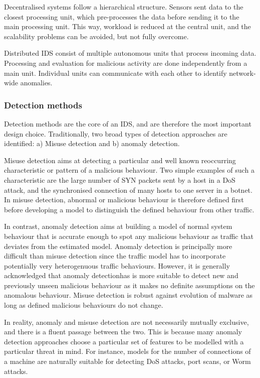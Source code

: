 \documentclass[a4paper,12pt,twoside]{report}
\begin{document}
Decentralised systems follow a hierarchical structure. Sensors sent data to the closest processing unit, which pre-processes the data before sending it to the main processing unit. This way, workload is reduced at the central unit, and
the scalability problems can be avoided, but not fully overcome. 

Distributed IDS consist of multiple autonomous units that process incoming data. Processing and evaluation for malicious activity are done independently from a main unit. Individual units can communicate with each other to identify network-wide anomalies.


\subsubsection*{Detection methods}

Detection methods are the core of an IDS, and are therefore the most important design choice. Traditionally, two broad types of detection approaches are identified: a) Misuse detection and b) anomaly detection. 

Misuse detection aims at detecting a particular and well known reoccurring characteristic or pattern of a malicious behaviour. Two simple examples of such a characteristic are the large number of SYN packets sent by a host in a DoS attack, and the synchronised connection of many hosts to one server in a botnet. In misuse detection, abnormal or malicious behaviour is therefore defined first before developing a model to distinguish the defined behaviour from other traffic.

In contrast, anomaly detection aims at building a model of normal system behaviour that is accurate enough to spot any malicious behaviour as traffic that deviates from the estimated model. Anomaly detection is principally more difficult than misuse detection since the traffic model has to incorporate potentially very heterogenuous traffic behaviours. However, it is generally acknowledged that anomaly detectionhas is more suitable to detect new and previously unseen malicious behaviour as it makes no definite assumptions on the anomalous behaviour. Misuse detection is robust against evolution of malware as long as defined malicious behaviours do not change.

In reality, anomaly and misuse detection are not necessarily mutually exclusive, and there is a fluent passage between the two. This is because many anomaly detection approaches choose a particular set of features to be modelled with a particular threat in mind. For instance, models for the number of connections of a machine are naturally suitable for detecting DoS attacks, port scans, or Worm attacks. 
\end{document}
